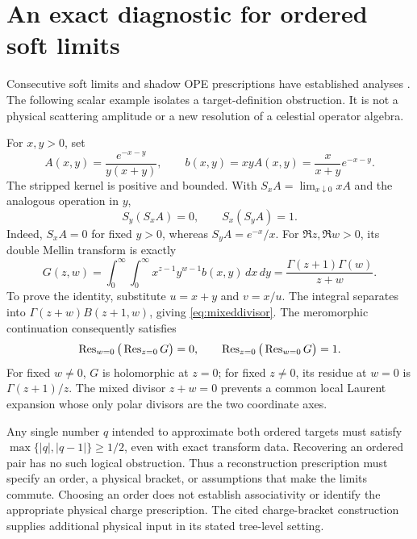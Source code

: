 \section{An exact diagnostic for ordered soft limits}
\label{sec:ordered}
Consecutive soft limits and shadow OPE prescriptions have established
analyses \cite{shadowstress,chargebracket}. The following scalar example
isolates a target-definition obstruction. It is not a physical scattering
amplitude or a new resolution of a celestial operator algebra.

For $x,y>0$, set
\[
 A(x,y)=\frac{e^{-x-y}}{y(x+y)},\qquad
 b(x,y)=xyA(x,y)=\frac{x}{x+y}e^{-x-y}.
\]
The stripped kernel is positive and bounded. With
$S_xA=\lim_{x\downarrow0}xA$ and the analogous operation in $y$,
\[
 S_y(S_xA)=0,\qquad S_x(S_yA)=1.
\]
Indeed, $S_xA=0$ for fixed $y>0$, whereas $S_yA=e^{-x}/x$.
For $\Re z,\Re w>0$, its double Mellin transform is exactly
\begin{equation}\label{eq:mixeddivisor}
 G(z,w)=\int_0^\infty\!\int_0^\infty
 x^{z-1}y^{w-1}b(x,y)\,dx\,dy
 =\frac{\Gamma(z+1)\Gamma(w)}{z+w}.
\end{equation}
To prove the identity, substitute $u=x+y$ and $v=x/u$.
The integral separates into
$\Gamma(z+w)B(z+1,w)$, giving \eqref{eq:mixeddivisor}.
The meromorphic continuation consequently satisfies
\[
 \operatorname{Res}_{w=0}\big(\operatorname{Res}_{z=0}G\big)=0,\qquad
 \operatorname{Res}_{z=0}\big(\operatorname{Res}_{w=0}G\big)=1.
\]
For fixed $w\ne0$, $G$ is holomorphic at $z=0$; for fixed
$z\ne0$, its residue at $w=0$ is $\Gamma(z+1)/z$.
The mixed divisor $z+w=0$ prevents a common local Laurent expansion
whose only polar divisors are the two coordinate axes.

Any single number $q$ intended to approximate both ordered targets
must satisfy $\max\{|q|,|q-1|\}\ge1/2$, even with exact transform
data. Recovering an ordered pair has no such logical obstruction.
Thus a reconstruction prescription must specify an order, a physical
bracket, or assumptions that make the limits commute. Choosing an order
does not establish associativity or identify the appropriate physical
charge prescription. The cited charge-bracket construction supplies
additional physical input in its stated tree-level setting.
